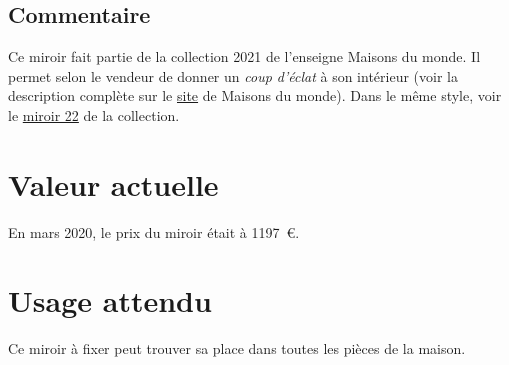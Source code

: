     \subsection* {Commentaire}
     Ce miroir fait partie de la collection 2021 de l’enseigne Maisons du monde. Il
                permet selon le vendeur de donner un 
    {\em {coup d’éclat}}
   à son intérieur (voir la
                description complète sur le 
    \href{http://www.maisonsdumonde.com/FR/fr/p/miroir-rond-or-etoile-d120-M20020841.htm}{site}
   de Maisons du monde).  Dans le même style, voir le 
    \href{miroir22.xml}{miroir 22}
   de la collection. 
    \section* {Valeur actuelle}
    En mars 2020, le prix du miroir était à 1197 €.
    \section* {Usage attendu}
     Ce miroir à fixer peut trouver sa place dans toutes les pièces de la maison.   
  